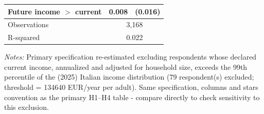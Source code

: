 \begin{table}[H]
\begin{tabular}{ l c c }
\hspace{0.05cm} Future income $>$ current & 0.008 & (0.016) \\
\hline
\hspace{0.05cm} Observations & \multicolumn{2}{c}{3,168} \\
\hspace{0.05cm} R-squared & \multicolumn{2}{c}{0.022} \\
\hline \hline
\end{tabular}
\begin{tablenotes}
\small
\item \textit{Notes:} Primary specification re-estimated excluding respondents whose declared current income, annualized and adjusted for household size, exceeds the 99th percentile of the (2025) Italian income distribution (79 respondent(s) excluded; threshold = 134640 EUR/year per adult). Same specification, columns and stars convention as the primary H1--H4 table - compare directly to check sensitivity to this exclusion.
\end{tablenotes}
    \label{tab:table4}
\end{table}
